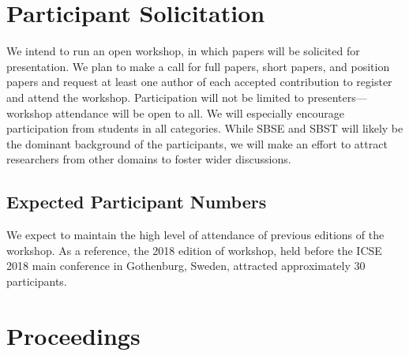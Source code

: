 \documentclass[10pt,conference]{IEEEtran}
\begin{document}

\section{Participant Solicitation}

We intend to run an open workshop, in which papers will be solicited
for presentation.  We plan to make a call for full papers, short
papers, and position papers and request at least one author of each
accepted contribution to register and attend the workshop.
Participation will not be limited to presenters---workshop attendance
will be open to all.  We will
especially encourage participation from students in all
categories.  
While SBSE and SBST will likely be the dominant background
of the participants, we will make an effort to attract researchers
from other domains to foster wider discussions.

\subsection{Expected Participant Numbers}
\label{sec:expectedparticipants}


We expect to maintain the high level of attendance of previous
editions of the workshop. As a reference, the 2018 edition of
workshop, held before the ICSE 2018 main conference in Gothenburg,
Sweden, attracted approximately 30 participants.

\section{Proceedings}
\end{document}
